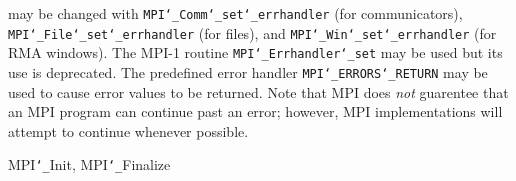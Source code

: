 may be changed with {\tt MPI{\tt \char`\_}Comm{\tt \char`\_}set{\tt \char`\_}errhandler} (for communicators),
{\tt MPI{\tt \char`\_}File{\tt \char`\_}set{\tt \char`\_}errhandler} (for files), and {\tt MPI{\tt \char`\_}Win{\tt \char`\_}set{\tt \char`\_}errhandler} (for
RMA windows).  The MPI-1 routine {\tt MPI{\tt \char`\_}Errhandler{\tt \char`\_}set} may be used but
its use is deprecated.  The predefined error handler
{\tt MPI{\tt \char`\_}ERRORS{\tt \char`\_}RETURN} may be used to cause error values to be returned.
Note that MPI does {\em not} guarentee that an MPI program can continue past
an error; however, MPI implementations will attempt to continue whenever
possible.
\par
{}
\par
{}
 MPI{\tt \char`\_}Init, MPI{\tt \char`\_}Finalize
\nextline
{}
\endmanpage
